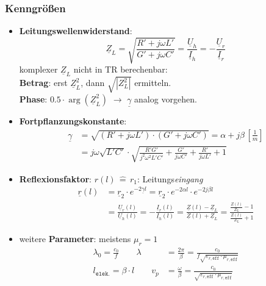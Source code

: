 \subsubsection{Kenngrößen}
\begin{itemize}
	\item \textbf{Leitungswellenwiderstand}:
	      \begin{equation*}
		      \underline{Z}_L = \sqrt{ \frac{R' + j \omega L'}{G' + j \omega C'}} = \frac{\underline{U}_h}{\underline{I}_h} =- \frac{\underline{U}_r}{\underline{I}_r}
	      \end{equation*}
	      komplexer $\underline{Z}_L$ nicht in TR berechenbar:\\
	      \textbf{Betrag}: erst $\underline{Z}_L^2$, dann $\sqrt{|Z_L^2|}$ ermitteln.\\
	      \textbf{Phase}: $0.5 \cdot \arg(\underline{Z}_L^2)$ \quad
	      $\rightarrow$  $\underline{\gamma}$ analog vorgehen.

	\item \textbf{Fortpflanzungskonstante}:
	      \begin{align*}
		      \underline{\gamma} & = \sqrt{(R'+j\omega L')\cdot(G'+j\omega C')} = \alpha + j \beta \, \left[ \frac{1}{m} \right]                             \\
		                         & = j \omega \sqrt{L'C'} \cdot \sqrt{ \frac{R'G'}{j^2 \omega^2 L'C'} + \frac{G'}{j \omega C'} + \frac{R'}{j \omega L'} + 1}
	      \end{align*}

	\item \textbf{Reflexionsfaktor}: \qquad
	      $ r(l) \, \widehat{=} \, r_1 $: Leitungs\textit{eingang}
	      \begin{align*}
		      \underline{r}(l) & = \underline{r}_2 \cdot e^{-2\underline{\gamma}l} = \underline{r}_2\cdot e^{-2\alpha l}\cdot e^{-2j\beta l} \\
		                       & = 	\frac{\underline{U}_r(l)}{\underline{U}_h(l)} = -\frac{\underline{I}_r(l)}{\underline{I}_h(l)}
		      =\frac{\underline{Z}(l)-\underline{Z}_L}{\underline{Z}(l)+\underline{Z}_L} = \frac{\tfrac{Z(l)}{Z_L}-1}{\tfrac{Z(l)}{Z_L}+1}
	      \end{align*}

	\item weitere \textbf{Parameter}: \qquad meistens $ \mu_r = 1 $
	      \begin{align*}
		      \lambda_0  = \frac{c_0}{f} \qquad \lambda     & = \frac{2\pi}{\beta} = \frac{c_0}{f\sqrt{\varepsilon_{r,\texttt{eff}}\cdot \mu_{r,\texttt{eff}}}}  \\
		      l_{\texttt{elek.}} = \beta \cdot l \qquad v_p & = \frac{\omega}{\beta} = \frac{c_0}{\sqrt{\varepsilon_{r,\texttt{eff}}\cdot \mu_{r,\texttt{eff}}}}
	      \end{align*}
\end{itemize}

